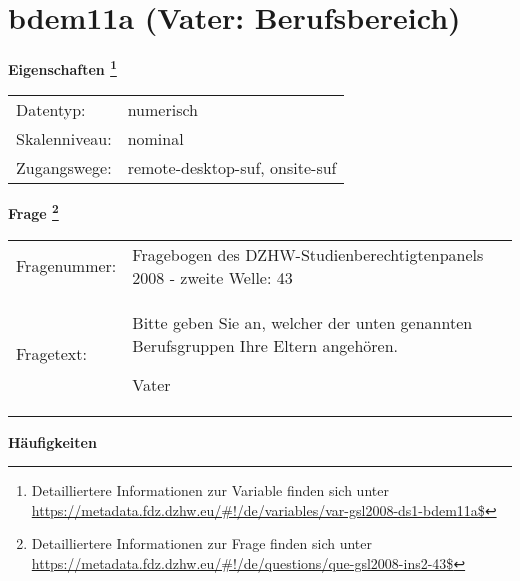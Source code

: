 
    \setcounter{footnote}{0}

    \vspace*{-1.8cm}
	\section{bdem11a (Vater: Berufsbereich)}
	\label{section:bdem11a}



    \vspace*{0.5cm}
    \noindent\textbf{Eigenschaften
	\footnote{Detailliertere Informationen zur Variable finden sich unter
		\url{https://metadata.fdz.dzhw.eu/\#!/de/variables/var-gsl2008-ds1-bdem11a$}}}\\
	\begin{tabularx}{\hsize}{@{}lX}
	Datentyp: & numerisch \\
	Skalenniveau: & nominal \\
	Zugangswege: &
	  remote-desktop-suf, 
	  onsite-suf
 \\
    \end{tabularx}



				\vspace*{0.5cm}
                \noindent\textbf{Frage
	                \footnote{Detailliertere Informationen zur Frage finden sich unter
		              \url{https://metadata.fdz.dzhw.eu/\#!/de/questions/que-gsl2008-ins2-43$}}}\\
				\begin{tabularx}{\hsize}{@{}lX}
					Fragenummer: &
					  Fragebogen des DZHW-Studienberechtigtenpanels 2008 - zweite Welle:
					  43
 \\
					Fragetext: & Bitte geben Sie an, welcher der unten genannten Berufsgruppen Ihre Eltern angehören.\par  Vater \\
				\end{tabularx}





        		\vspace*{0.5cm}
                \noindent\textbf{Häufigkeiten}

